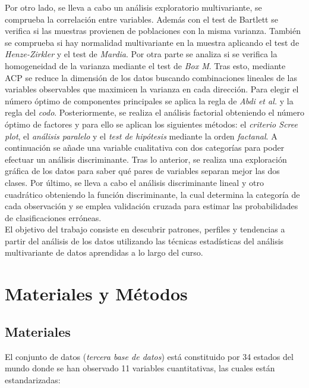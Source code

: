\documentclass[11pt,a4paper]{article}
\begin{document}
        Por otro lado, se lleva a cabo un análisis exploratorio multivariante, se comprueba la correlación entre variables. Además con el test de Bartlett se verifica si las muestras provienen de poblaciones con la misma varianza. También se comprueba si hay normalidad multivariante en la muestra aplicando el test de \textit{Henze-Zirkler} y el test de \textit{Mardia}. Por otra parte se analiza si se verifica la homogeneidad de la varianza mediante el test de \textit{Box M}. Tras esto, mediante ACP se reduce la dimensión de los datos buscando combinaciones lineales de las variables observables que maximicen la varianza en cada dirección. Para elegir el número óptimo de componentes principales se aplica la regla de \textit{Abdi et al.} y la regla del \textit{codo}. Posteriormente, se realiza el análisis factorial obteniendo el número óptimo de factores y para ello se aplican los siguientes métodos: el \textit{criterio Scree plot}, el \textit{análisis paralelo} y el \textit{test de hipótesis} mediante la orden \textit{factanal}. A continuación se añade una variable cualitativa con dos categorías para poder efectuar un análisis discriminante. Tras lo anterior, se realiza una exploración gráfica de los datos para saber qué pares de variables separan mejor las dos clases. Por último, se lleva a cabo el análisis discriminante lineal y otro cuadrático obteniendo la función discriminante, la cual determina la categoría de cada observación y se emplea validación cruzada para estimar las probabilidades de clasificaciones erróneas. \\
    
        El objetivo del trabajo consiste en descubrir patrones, perfiles y tendencias a partir del análisis de los datos utilizando las técnicas estadísticas del análisis multivariante de datos aprendidas a lo largo del curso. \\ 
    	
    	\newpage
	
	\section{Materiales y Métodos}
	
	\subsection{Materiales}
	
    	El conjunto de datos (\textit{tercera base de datos}) está constituido por 34 estados del mundo donde se han observado 11 variables cuantitativas, las cuales están estandarizadas: 
    	
\end{document}
